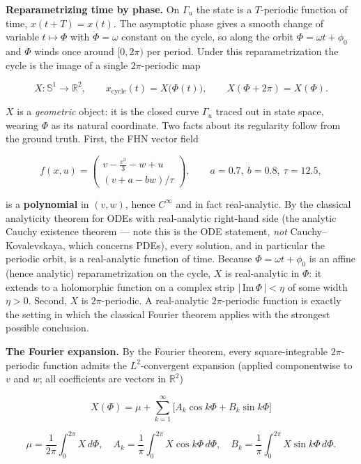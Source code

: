 \documentclass[
  11pt,
]{article}
\providecommand{\lt}{<}
\providecommand{\gt}{>}
\begin{document}
\textbf{Reparametrizing time by phase.} On \(\Gamma_u\) the state is a
\(T\)-periodic function of time, \(x(t+T)=x(t)\). The asymptotic phase
gives a smooth change of variable \(t\mapsto\Phi\) with
\(\dot\Phi=\omega\) constant on the cycle, so along the orbit
\(\Phi=\omega t+\phi_0\) and \(\Phi\) winds once around \([0,2\pi)\) per
period. Under this reparametrization the cycle is the image of a single
\(2\pi\)-periodic map

\[
X:\mathbb{S}^1\to\mathbb{R}^2,\qquad x_{\text{cycle}}(t)=X\big(\Phi(t)\big),\qquad X(\Phi+2\pi)=X(\Phi). \tag{7.1}
\]

\(X\) is a \emph{geometric} object: it is the closed curve \(\Gamma_u\)
traced out in state space, wearing \(\Phi\) as its natural coordinate.
Two facts about its regularity follow from the ground truth. First, the
FHN vector field

\[
f(x,u)=\begin{pmatrix} v-\tfrac{v^3}{3}-w+u\\[2pt] (v+a-bw)/\tau\end{pmatrix},\qquad a=0.7,\ b=0.8,\ \tau=12.5,
\]

is a \textbf{polynomial} in \((v,w)\), hence \(C^\infty\) and in fact
real-analytic. By the classical analyticity theorem for ODEs with
real-analytic right-hand side (the analytic Cauchy existence theorem ---
note this is the ODE statement, \emph{not} Cauchy--Kovalevskaya, which
concerns PDEs), every solution, and in particular the periodic orbit, is
a real-analytic function of time. Because \(\Phi=\omega t+\phi_0\) is an
affine (hence analytic) reparametrization on the cycle, \(X\) is
real-analytic in \(\Phi\): it extends to a holomorphic function on a
complex strip \(|\,\mathrm{Im}\,\Phi\,|\lt \eta\) of some width
\(\eta\gt 0\). Second, \(X\) is \(2\pi\)-periodic. A real-analytic
\(2\pi\)-periodic function is exactly the setting in which the classical
Fourier theorem applies with the strongest possible conclusion.

\textbf{The Fourier expansion.} By the Fourier theorem, every
square-integrable \(2\pi\)-periodic function admits the
\(L^2\)-convergent expansion (applied componentwise to \(v\) and \(w\);
all coefficients are vectors in \(\mathbb{R}^2\))

\[
\boxed{\;X(\Phi)=\mu+\sum_{k=1}^{\infty}\Big[A_k\cos k\Phi+B_k\sin k\Phi\Big]\;}\tag{7.2}
\]

\[
\mu=\frac{1}{2\pi}\!\int_0^{2\pi}\!\!X\,d\Phi,\quad
A_k=\frac{1}{\pi}\!\int_0^{2\pi}\!\!X\cos k\Phi\,d\Phi,\quad
B_k=\frac{1}{\pi}\!\int_0^{2\pi}\!\!X\sin k\Phi\,d\Phi. \tag{7.3}
\]
\end{document}
